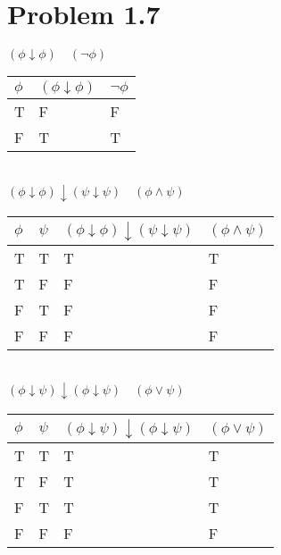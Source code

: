 \documentclass[10pt]{article}
\begin{document}
\section*{Problem 1.7}
$(\phi\downarrow\phi)\quad (\lnot\phi)$
\begin{table}[h]
    \begin{tabular}{|l|l|l|}
    \hline
    $\phi$ & $(\phi\downarrow\phi)$ & $\lnot\phi$ \\ \hline
    T      & F                      & F           \\ \hline
    F      & T                      & T           \\ \hline
    \end{tabular}
    \end{table}\\
$(\phi\downarrow\phi)\downarrow(\psi\downarrow\psi)\quad(\phi\land\psi)$\\
\begin{table}[h]
    \begin{tabular}{|l|l|l|l|}
    \hline
    $\phi$ & $\psi$ & $(\phi\downarrow\phi)\downarrow(\psi\downarrow\psi)$ & $(\phi\land\psi)$ \\ \hline
    T      & T      & T                                                    & T                 \\ \hline
    T      & F      & F                                                    & F                 \\ \hline
    F      & T      & F                                                    & F                 \\ \hline
    F      & F      & F                                                    & F                 \\ \hline
    \end{tabular}
    \end{table}\\
$(\phi\downarrow\psi)\downarrow(\phi\downarrow\psi)\quad(\phi\lor\psi)$\\
\begin{table}[h]
    \begin{tabular}{|l|l|l|l|}
    \hline
    $\phi$ & $\psi$ & $(\phi\downarrow\psi)\downarrow(\phi\downarrow\psi)$ & $(\phi\lor\psi)$ \\ \hline
    T      & T      & T                                                    & T                \\ \hline
    T      & F      & T                                                    & T                \\ \hline
    F      & T      & T                                                    & T                \\ \hline
    F      & F      & F                                                    & F                \\ \hline
    \end{tabular}
    \end{table}\\
\end{document}
